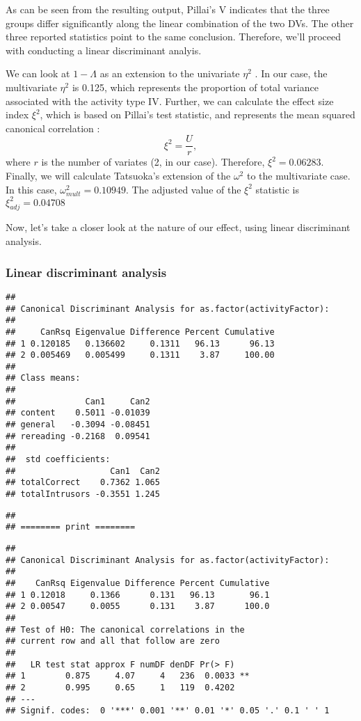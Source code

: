 \documentclass[12pt,]{article}
\begin{document}
As can be seen from the resulting output, Pillai's V indicates that the
three groups differ significantly along the linear combination of the
two DVs. The other three reported statistics point to the same
conclusion. Therefore, we'll proceed with conducting a linear
discriminant analyis.

We can look at \(1 - \Lambda\) as an extension to the univariate
\(\eta^2\) \citep{huberty_applied_2006}. In our case, the multivariate
\(\eta^2\) is 0.125, which represents the proportion of total variance
associated with the activity type IV. Further, we can calculate the
effect size index \(\xi^2\), which is based on Pillai's test statistic,
and represents the mean squared canonical correlation
\citep{huberty_applied_2006}: \[\xi^2 = \frac{U}{r},\] where \(r\) is
the number of variates (2, in our case). Therefore, \(\xi^2 = 0.06283\).
Finally, we will calculate Tatsuoka's
\citep[1970; according to][]{huberty_applied_2006} extension of the
\(\omega^2\) to the multivariate case. In this case,
\(\omega^2_{mult} = 0.10949\). The adjusted value of the \(\xi^2\)
statistic is \(\xi^2_{adj} = 0.04708\)

Now, let's take a closer look at the nature of our effect, using linear
discriminant analysis.

\hypertarget{linear-discriminant-analysis}{%
\subsubsection{Linear discriminant
analysis}\label{linear-discriminant-analysis}}

\begin{verbatim}
## 
## Canonical Discriminant Analysis for as.factor(activityFactor):
## 
##     CanRsq Eigenvalue Difference Percent Cumulative
## 1 0.120185   0.136602     0.1311   96.13      96.13
## 2 0.005469   0.005499     0.1311    3.87     100.00
## 
## Class means:
## 
##              Can1     Can2
## content    0.5011 -0.01039
## general   -0.3094 -0.08451
## rereading -0.2168  0.09541
## 
##  std coefficients:
##                   Can1  Can2
## totalCorrect    0.7362 1.065
## totalIntrusors -0.3551 1.245
\end{verbatim}

\begin{verbatim}
## 
## ======== print ========
\end{verbatim}

\begin{verbatim}
## 
## Canonical Discriminant Analysis for as.factor(activityFactor):
## 
##    CanRsq Eigenvalue Difference Percent Cumulative
## 1 0.12018     0.1366      0.131   96.13       96.1
## 2 0.00547     0.0055      0.131    3.87      100.0
## 
## Test of H0: The canonical correlations in the 
## current row and all that follow are zero
## 
##   LR test stat approx F numDF denDF Pr(> F)   
## 1        0.875     4.07     4   236  0.0033 **
## 2        0.995     0.65     1   119  0.4202   
## ---
## Signif. codes:  0 '***' 0.001 '**' 0.01 '*' 0.05 '.' 0.1 ' ' 1
\end{verbatim}
\end{document}
